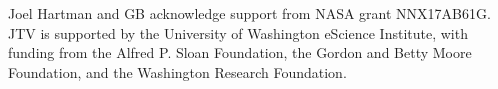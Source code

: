 \documentclass{aastex62}
\begin{document}
\begin{acknowledgements}
Joel Hartman and GB acknowledge support from NASA grant NNX17AB61G. JTV is supported by the University of Washington eScience Institute, with funding from the Alfred P. Sloan Foundation, the Gordon and Betty Moore Foundation, and the Washington Research Foundation.
\end{acknowledgements}



\end{document}
